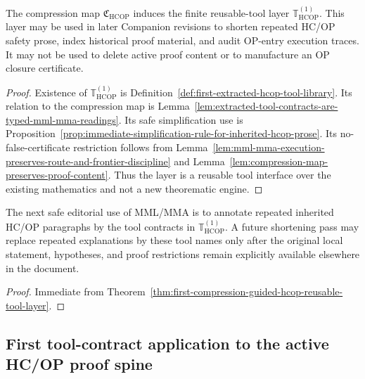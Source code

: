 \begin{theorem}
\label{thm:first-compression-guided-hcop-reusable-tool-layer}
The compression map \(\mathfrak C_{\mathrm{HCOP}}\) induces the finite reusable-tool layer \(\mathbb T_{\mathrm{HCOP}}^{(1)}\). This layer may be used in later Companion revisions to shorten repeated HC/OP safety prose, index historical proof material, and audit OP-entry execution traces. It may not be used to delete active proof content or to manufacture an OP closure certificate.
\end{theorem}

\begin{proof}
Existence of \(\mathbb T_{\mathrm{HCOP}}^{(1)}\) is Definition~\ref{def:first-extracted-hcop-tool-library}. Its relation to the compression map is Lemma~\ref{lem:extracted-tool-contracts-are-typed-mml-mma-readings}. Its safe simplification use is Proposition~\ref{prop:immediate-simplification-rule-for-inherited-hcop-prose}. Its no-false-certificate restriction follows from Lemma~\ref{lem:mml-mma-execution-preserves-route-and-frontier-discipline} and Lemma~\ref{lem:compression-map-preserves-proof-content}. Thus the layer is a reusable tool interface over the existing mathematics and not a new theorematic engine.
\end{proof}

\begin{corollary}
\label{cor:v3340-r09-working-rule}
The next safe editorial use of MML/MMA is to annotate repeated inherited HC/OP paragraphs by the tool contracts in \(\mathbb T_{\mathrm{HCOP}}^{(1)}\). A future shortening pass may replace repeated explanations by these tool names only after the original local statement, hypotheses, and proof restrictions remain explicitly available elsewhere in the document.
\end{corollary}

\begin{proof}
Immediate from Theorem~\ref{thm:first-compression-guided-hcop-reusable-tool-layer}.
\end{proof}

\subsection{First tool-contract application to the active HC/OP proof spine}
\label{subsec:first-tool-contract-application-active-hcop-proof-spine}

